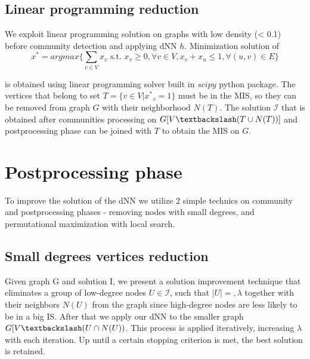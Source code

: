 \subsection{Linear programming reduction}

We exploit linear programming solution on graphs with low density (< 0.1) before community detection and applying dNN $h$. Minimization solution of 
\begin{equation}
    x^* = argmax \{\sum_{v\in V} x_v \text{ s.t. } x_v \geq 0, \forall v \in V, x_v + x_u \leq  1, \forall (u,v) \in E\}
\end{equation}

is obtained using linear programming solver built in $scipy$ python package. The vertices that belong to set $T = \{v \in V | {x^*}_v = 1\}$ must be in the MIS, so they can be removed from graph $G$ with their neighborhood $N(T)$. The solution $\mathcal{I}$ that is obtained after communities processing on $G[V\textbackslash(T\cup N(T))]$ and postprocessing phase can be joined with $T$ to obtain the MIS on $G$.

\section{Postprocessing phase}
To improve the solution of the dNN we utilize 2 simple technics on community and postprocessing phases - removing nodes with small degrees, and permutational maximization with local search.

\subsection{Small degrees vertices reduction}
Given graph G and solution I, we present a solution improvement technique that eliminates a group of low-degree nodes $U \in \mathcal{I}$, such that $|U| =,\lambda$ together with their neighbors $N(U)$ from the graph since high-degree nodes are less likely to be in a big IS. After that we apply our dNN to the smaller graph $G[V\textbackslash (U \cap N(U))$. This process is applied iteratively, increasing $\lambda$ with each iteration. Up until a certain stopping criterion is met, the best solution is retained. 

